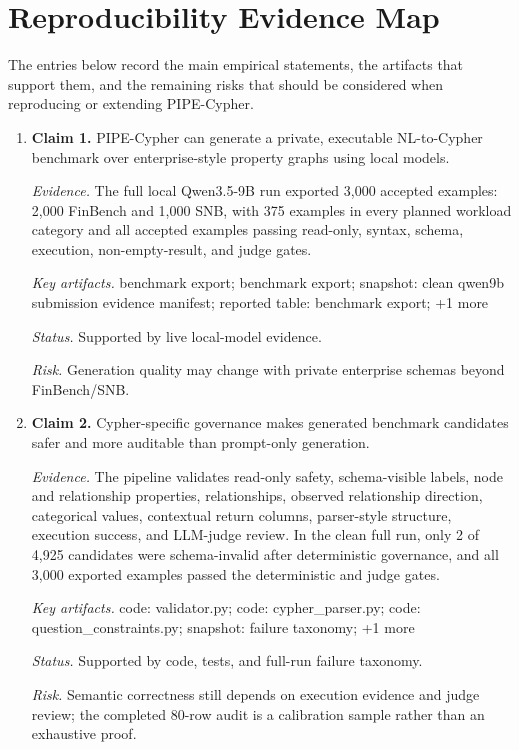 \section{Reproducibility Evidence Map}
\label{tab:claim_evidence_map}
The entries below record the main empirical statements, the artifacts that support them, and the remaining risks that should be considered when reproducing or extending PIPE-Cypher.
\begin{enumerate}
\item \textbf{Claim 1.} PIPE-Cypher can generate a private, executable NL-to-Cypher benchmark over enterprise-style property graphs using local models.\par
\textit{Evidence.} The full local Qwen3.5-9B run exported 3,000 accepted examples: 2,000 FinBench and 1,000 SNB, with 375 examples in every planned workload category and all accepted examples passing read-only, syntax, schema, execution, non-empty-result, and judge gates.\par
\textit{Key artifacts.} benchmark export; benchmark export; snapshot: clean qwen9b submission evidence manifest; reported table: benchmark export; +1 more\par
\textit{Status.} Supported by live local-model evidence.\par
\textit{Risk.} Generation quality may change with private enterprise schemas beyond FinBench/SNB.
\item \textbf{Claim 2.} Cypher-specific governance makes generated benchmark candidates safer and more auditable than prompt-only generation.\par
\textit{Evidence.} The pipeline validates read-only safety, schema-visible labels, node and relationship properties, relationships, observed relationship direction, categorical values, contextual return columns, parser-style structure, execution success, and LLM-judge review. In the clean full run, only 2 of 4,925 candidates were schema-invalid after deterministic governance, and all 3,000 exported examples passed the deterministic and judge gates.\par
\textit{Key artifacts.} code: validator.py; code: cypher\_parser.py; code: question\_constraints.py; snapshot: failure taxonomy; +1 more\par
\textit{Status.} Supported by code, tests, and full-run failure taxonomy.\par
\textit{Risk.} Semantic correctness still depends on execution evidence and judge review; the completed 80-row audit is a calibration sample rather than an exhaustive proof.

\end{enumerate}

